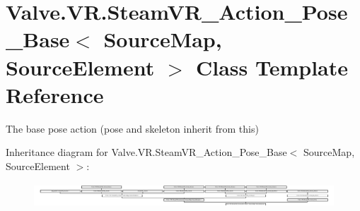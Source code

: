 \hypertarget{class_valve_1_1_v_r_1_1_steam_v_r___action___pose___base}{}\section{Valve.\+V\+R.\+Steam\+V\+R\+\_\+\+Action\+\_\+\+Pose\+\_\+\+Base$<$ Source\+Map, Source\+Element $>$ Class Template Reference}
\label{class_valve_1_1_v_r_1_1_steam_v_r___action___pose___base}


The base pose action (pose and skeleton inherit from this)  


Inheritance diagram for Valve.\+V\+R.\+Steam\+V\+R\+\_\+\+Action\+\_\+\+Pose\+\_\+\+Base$<$ Source\+Map, Source\+Element $>$\+:\begin{figure}[H]
\begin{center}
\leavevmode
\includegraphics[height=0.938967cm]{class_valve_1_1_v_r_1_1_steam_v_r___action___pose___base}
\end{center}
\end{figure}
